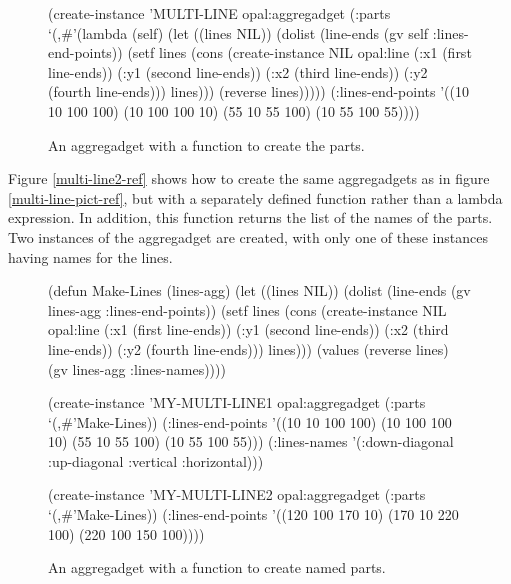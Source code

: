\begin{figure}
\begin{programexample}
(create-instance 'MULTI-LINE opal:aggregadget
   (:parts
    `(,\#'(lambda (self)
	   (let ((lines NIL))
	     (dolist (line-ends (gv self :lines-end-points))
	       (setf lines (cons (create-instance NIL opal:line
				   (:x1 (first line-ends))
				   (:y1 (second line-ends))
				   (:x2 (third line-ends))
				   (:y2 (fourth line-ends)))
				 lines)))
	     (reverse lines)))))
   (:lines-end-points '((10 10 100 100)
			(10 100 100 10)
			(55 10 55 100)
			(10 55 100 55))))
\end{programexample}

\caption{An aggregadget with a function to create the parts.}
\end{figure}


Figure \ref{multi-line2-ref} shows how to create the same aggregadgets as in
figure \ref{multi-line-pict-ref}, but with a separately defined function rather
than a lambda expression.
In addition, this function returns the list of the names of
the parts.  Two instances of the aggregadget are created, with only one of
these instances having names for the lines.

\begin{figure}
\begin{programexample}
(defun Make-Lines (lines-agg)
  (let ((lines NIL))
    (dolist (line-ends (gv lines-agg :lines-end-points))
      (setf lines (cons (create-instance NIL opal:line
			   (:x1 (first line-ends))
			   (:y1 (second line-ends))
		           (:x2 (third line-ends))
			   (:y2 (fourth line-ends)))
			lines)))
    (values (reverse lines) (gv lines-agg :lines-names))))

(create-instance 'MY-MULTI-LINE1 opal:aggregadget
   (:parts `(,\#'Make-Lines))
   (:lines-end-points '((10 10 100 100)
                        (10 100 100 10)
                        (55 10 55 100)
                        (10 55 100 55)))
   (:lines-names
    '(:down-diagonal :up-diagonal :vertical :horizontal)))

(create-instance 'MY-MULTI-LINE2 opal:aggregadget
   (:parts `(,\#'Make-Lines))
   (:lines-end-points '((120 100 170 10)
                        (170 10 220 100)
                        (220 100 150 100))))
\end{programexample}

\caption{An aggregadget with a function to create named parts.}
\end{figure}


